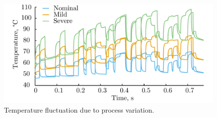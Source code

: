 \begin{figure}[bl]
  \vspace{-1.0em}
  \centering
  \includegraphics[width=1.0\linewidth]{include/assets/motivation-curve.pdf}
  \caption{Temperature fluctuation due to process variation.}
\end{figure}
